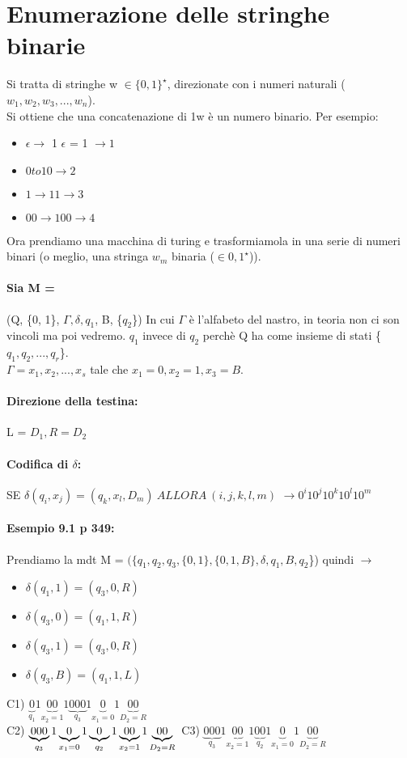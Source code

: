 \documentclass[12pt, a4paper, openany, oneside]{book}
\begin{document}
\section{Enumerazione delle stringhe binarie}
Si tratta di stringhe w $\in \{0, 1\}^{\star}$, direzionate con i numeri naturali 
($w_{1}, w_{2}, w_{3}, ..., w_{n}$). 
\\ Si ottiene che una concatenazione di 1w è un numero binario. Per esempio:
\begin{itemize}
	\item $\epsilon \to$ 1 $\epsilon$ = 1 $\to 1$
	\item $0 to 10 \to 2 $
	\item $1 \to 11 \to 3$
	\item $00 \to 100 \to 4 $
\end{itemize}
Ora prendiamo una macchina di turing e trasformiamola in una serie di numeri binari
(o meglio, una stringa $w_{m}$ binaria ($\in {0, 1}^{\star}$)).
\paragraph{Sia M = }(Q, \{0, 1\}, $\Gamma, \delta, q_{1}$, B, \{$q_{2}$\})
In cui $\Gamma$ è l'alfabeto del nastro,
in teoria non ci son vincoli ma poi vedremo. $q_{1}$ invece di $q_{2}$ perchè Q ha
come insieme di stati \{$q_{1}, q_{2}, ..., q_{r}$\}.
\\
$\Gamma = {x_{1}, x_{2}, ..., x_{s}}$ tale che $x_{1} = 0, x_{2} = 1, x_{3} = B$.
\paragraph{Direzione della testina: }L = $D_{1}, R = D_{2}$
\paragraph{Codifica di $\delta$: }SE $\delta(q_{i}, x_{j}) = (q_{k}, x_{l}, D_{m})
~ALLORA~ (i, j, k, l, m)$ $\to 0^{i}10^{j}10^{k}10^{l}10^{m}$
\paragraph{Esempio 9.1 p 349: }Prendiamo la mdt M = $(\{q_{1}, q_{2}, q_{3}, \{0,1\}
, \{0, 1, B\}, \delta, q_{1}, B, {q_{2}}$\}) quindi $\to$
\begin{itemize}
	\item $\delta(q_{1}, 1) = (q_{3}, 0, R)$
	\item $\delta(q_{3}, 0) = (q_{1}, 1, R)$
	\item $\delta(q_{3}, 1) = (q_{3}, 0, R)$
	\item $\delta(q_{3}, B) = (q_{1}, 1, L)$
\end{itemize}
C1) $\underbrace{0}_{q_{1}} 1 \underbrace{00}_{x_{2} = 1} 1 \underbrace{000}_{q_{3}} 1
\underbrace{0}_{x_{1} = 0} 1 \underbrace{00}_{D_{2} = R}$ \\ 
C2) $\underbrace{000}_{q_{3}} 1 
\underbrace{0}_{x_{1} = 0}1 \underbrace{0}_{q_{2}} 1 \underbrace{00}_{x_{2} = 1} 1 \underbrace{00}_{D_{2} = R}\\$ 
C3) $\underbrace{000}_{q_{3}}1\underbrace{00}_{x_{2} = 1}1\underbrace{00}_{q_{2}}1\underbrace{0}_{x_{1}=0}1\underbrace{00}_{D_{2} = R}$\\
\end{document}
